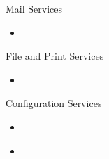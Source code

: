 \documentclass{beamer}
\begin{document}
\begin{frame}{Mail Services}

\begin{itemize}
\item
\end{itemize}

\end{frame}

\begin{frame}{File and Print Services}

\begin{itemize}
\item
\end{itemize}

\end{frame}

\begin{frame}{Configuration Services}

\begin{itemize}
\item
\end{itemize}

\end{frame}

\begin{frame}{}

\begin{itemize}
\item
\end{itemize}

\end{frame}




\end{document}
